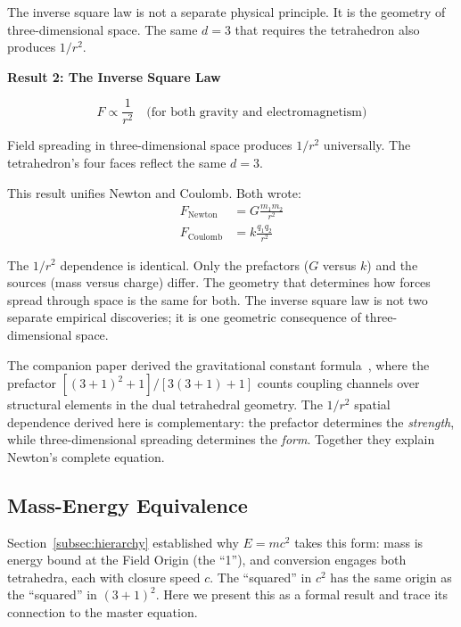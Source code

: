 \documentclass[aps,prd,preprint,superscriptaddress,showpacs,preprintnumbers,amsmath,amssymb,nofootinbib]{revtex4-2}
\begin{document}
The inverse square law is not a separate physical principle. It is the geometry of three-dimensional space. The same $d = 3$ that requires the tetrahedron also produces $1/r^2$.

\vspace{1.5em}
\noindent
\colorbox{resultgreen}{\parbox{\dimexpr\textwidth-2\fboxsep\relax}{%
\vspace{0.8em}
\centering
\textbf{\large Result 2: The Inverse Square Law}

\vspace{0.5em}
\boldmath
\begin{equation}
F \propto \frac{1}{r^2} \quad \text{(for both gravity and electromagnetism)}
\end{equation}
\unboldmath

\vspace{0.3em}
Field spreading in three-dimensional space produces $1/r^2$ universally. The tetrahedron's four faces reflect the same $d = 3$.
\vspace{0.5em}
}}
\vspace{1cm}

This result unifies Newton and Coulomb. Both wrote:
\begin{align}
F_{\text{Newton}} &= G\frac{m_1 m_2}{r^2} \\[0.5em]
F_{\text{Coulomb}} &= k\frac{q_1 q_2}{r^2}
\end{align}

The $1/r^2$ dependence is identical. Only the prefactors ($G$ versus $k$) and the sources (mass versus charge) differ. The geometry that determines how forces spread through space is the same for both. The inverse square law is not two separate empirical discoveries; it is one geometric consequence of three-dimensional space.

The companion paper derived the gravitational constant formula~\cite{paper6}, where the prefactor $[(3+1)^2+1]/[3(3+1)+1]$ counts coupling channels over structural elements in the dual tetrahedral geometry. The $1/r^2$ spatial dependence derived here is complementary: the prefactor determines the \emph{strength}, while three-dimensional spreading determines the \emph{form}. Together they explain Newton's complete equation.

\subsection{Mass-Energy Equivalence}
\label{subsec:emc2}

Section~\ref{subsec:hierarchy} established why $E = mc^2$ takes this form: mass is energy bound at the Field Origin (the ``1''), and conversion engages both tetrahedra, each with closure speed $c$. The ``squared'' in $c^2$ has the same origin as the ``squared'' in $(3+1)^2$. Here we present this as a formal result and trace its connection to the master equation.
\end{document}

